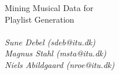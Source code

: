 \thispagestyle{empty}

{\noindent \LARGE Mining Musical Data for\\Playlist Generation}
\vspace{1cm}
\\\\
\textit{\noindent Sune Debel (sdeb@itu.dk) \\ \noindent Magnus Stahl (msta@itu.dk) \\ \noindent Niels Abildgaard (nroe@itu.dk)}
\vspace{3cm}
